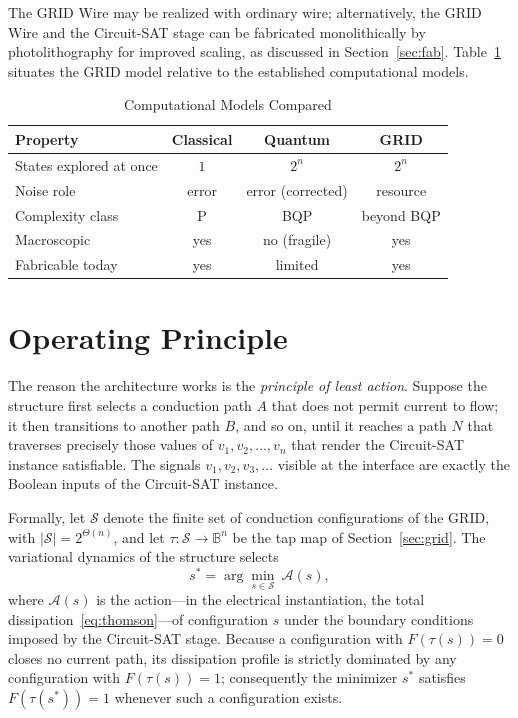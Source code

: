 \documentclass[letterpaper,journal]{IEEEtran}
\begin{document}
The GRID Wire may be realized with ordinary wire; alternatively, the GRID
Wire and the Circuit-SAT stage can be fabricated monolithically by
photolithography for improved scaling, as discussed in
Section~\ref{sec:fab}. Table~\ref{tab:models} situates the GRID model
relative to the established computational models.

\begin{table}[!t]
\centering
\caption{Computational Models Compared}
\label{tab:models}
\begin{tabular}{lccc}
\toprule
\textbf{Property} & \textbf{Classical} & \textbf{Quantum} & \textbf{GRID} \\
\midrule
States explored at once & $1$ & $2^{n}$ & $2^{n}$ \\
Noise role & error & error (corrected) & resource \\
Complexity class & P & BQP & beyond BQP \\
Macroscopic & yes & no (fragile) & yes \\
Fabricable today & yes & limited & yes \\
\bottomrule
\end{tabular}
\end{table}

\section{Operating Principle}
\label{sec:principle}

The reason the architecture works is the \emph{principle of least action}.
Suppose the structure first selects a conduction path $A$ that does not
permit current to flow; it then transitions to another path $B$, and so on,
until it reaches a path $N$ that traverses precisely those values of
$v_1, v_2, \dots, v_n$ that render the Circuit-SAT instance satisfiable. The
signals $v_1, v_2, v_3, \dots$ visible at the interface are exactly the
Boolean inputs of the Circuit-SAT instance.

Formally, let $\mathcal{S}$ denote the finite set of conduction
configurations of the GRID, with $\lvert\mathcal{S}\rvert=2^{\Theta(n)}$,
and let $\tau:\mathcal{S}\to\mathbb{B}^{n}$ be the tap map of
Section~\ref{sec:grid}. The variational dynamics of the structure selects
\begin{equation}
s^{*}=\arg\min_{s\in\mathcal{S}}\ \mathcal{A}(s),
\label{eq:leastaction}
\end{equation}
where $\mathcal{A}(s)$ is the action---in the electrical instantiation, the
total dissipation~\eqref{eq:thomson}---of configuration $s$ under the
boundary conditions imposed by the Circuit-SAT stage. Because a
configuration with $F(\tau(s))=0$ closes no current path, its dissipation
profile is strictly dominated by any configuration with $F(\tau(s))=1$;
consequently the minimizer $s^{*}$ satisfies $F(\tau(s^{*}))=1$ whenever
such a configuration exists.
\end{document}

